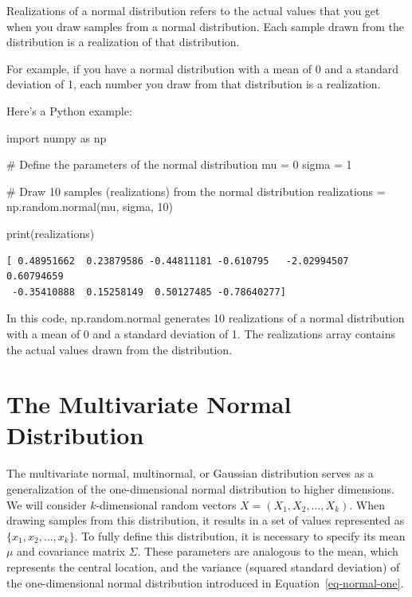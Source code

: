 \documentclass[
  letterpaper,
  DIV=11,
  numbers=noendperiod]{scrreprt}
\newenvironment{Shaded}{\begin{snugshade}}{\end{snugshade}}
\newcommand{\BuiltInTok}[1]{\textcolor[rgb]{0.00,0.23,0.31}{#1}}
\newcommand{\CommentTok}[1]{\textcolor[rgb]{0.37,0.37,0.37}{#1}}
\newcommand{\DecValTok}[1]{\textcolor[rgb]{0.68,0.00,0.00}{#1}}
\newcommand{\ImportTok}[1]{\textcolor[rgb]{0.00,0.46,0.62}{#1}}
\newcommand{\NormalTok}[1]{\textcolor[rgb]{0.00,0.23,0.31}{#1}}
\newcommand{\OperatorTok}[1]{\textcolor[rgb]{0.37,0.37,0.37}{#1}}
\begin{document}
Realizations of a normal distribution refers to the actual values that
you get when you draw samples from a normal distribution. Each sample
drawn from the distribution is a realization of that distribution.

For example, if you have a normal distribution with a mean of 0 and a
standard deviation of 1, each number you draw from that distribution is
a realization.

Here's a Python example:

\begin{Shaded}
\begin{Highlighting}[]
\ImportTok{import}\NormalTok{ numpy }\ImportTok{as}\NormalTok{ np}

\CommentTok{\# Define the parameters of the normal distribution}
\NormalTok{mu }\OperatorTok{=} \DecValTok{0}
\NormalTok{sigma }\OperatorTok{=} \DecValTok{1}

\CommentTok{\# Draw 10 samples (realizations) from the normal distribution}
\NormalTok{realizations }\OperatorTok{=}\NormalTok{ np.random.normal(mu, sigma, }\DecValTok{10}\NormalTok{)}

\BuiltInTok{print}\NormalTok{(realizations)}
\end{Highlighting}
\end{Shaded}

\begin{verbatim}
[ 0.48951662  0.23879586 -0.44811181 -0.610795   -2.02994507  0.60794659
 -0.35410888  0.15258149  0.50127485 -0.78640277]
\end{verbatim}

In this code, np.random.normal generates 10 realizations of a normal
distribution with a mean of 0 and a standard deviation of 1. The
realizations array contains the actual values drawn from the
distribution.

\hypertarget{the-multivariate-normal-distribution}{%
\section{The Multivariate Normal
Distribution}\label{the-multivariate-normal-distribution}}

The multivariate normal, multinormal, or Gaussian distribution serves as
a generalization of the one-dimensional normal distribution to higher
dimensions. We will consider \(k\)-dimensional random vectors
\(X = (X_1, X_2, \ldots, X_k)\). When drawing samples from this
distribution, it results in a set of values represented as
\(\{x_1, x_2, \ldots, x_k\}\). To fully define this distribution, it is
necessary to specify its mean \(\mu\) and covariance matrix \(\Sigma\).
These parameters are analogous to the mean, which represents the central
location, and the variance (squared standard deviation) of the
one-dimensional normal distribution introduced in
Equation~\ref{eq-normal-one}.
\end{document}
